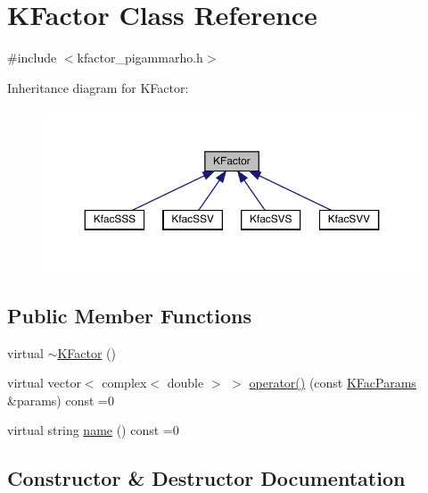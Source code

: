 \hypertarget{classKFactor}{}\section{K\+Factor Class Reference}
\label{classKFactor}


{\ttfamily \#include $<$kfactor\+\_\+pigammarho.\+h$>$}



Inheritance diagram for K\+Factor\+:
\nopagebreak
\begin{figure}[H]
\begin{center}
\leavevmode
\includegraphics[width=350pt]{d0/d85/classKFactor__inherit__graph}
\end{center}
\end{figure}
\subsection*{Public Member Functions}
\begin{DoxyCompactItemize}
\item 
virtual \mbox{\hyperlink{classKFactor_a8a39c5bbfa86a5603d95af238845cfd9}{$\sim$\+K\+Factor}} ()
\item 
virtual vector$<$ complex$<$ double $>$ $>$ \mbox{\hyperlink{classKFactor_a012aae9ff4a07eab86d5d50b7f774285}{operator()}} (const \mbox{\hyperlink{classKFacParams}{K\+Fac\+Params}} \&params) const =0
\item 
virtual string \mbox{\hyperlink{classKFactor_ae578f8d6e4b525895427717da99cab6c}{name}} () const =0
\end{DoxyCompactItemize}


\subsection{Constructor \& Destructor Documentation}
\mbox{\label{classKFactor_a8a39c5bbfa86a5603d95af238845cfd9}} 
